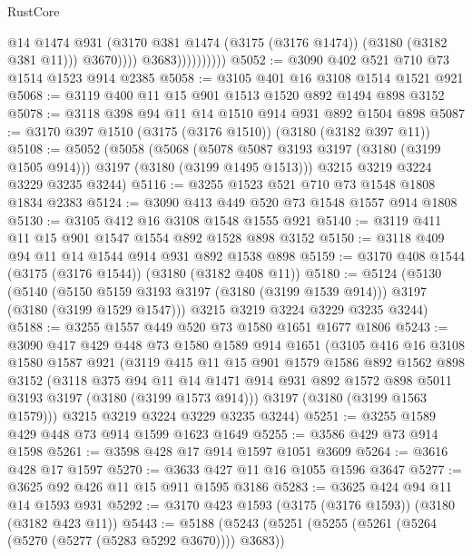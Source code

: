 \begin{lexlean}{RustCore}
\begin{coremodule}
                                @14
                                @1474
                                @931
                                (@3170 @381 @1474 (@3175 (@3176 @1474)) (@3180 (@3182 @381 @11)))
                                @3670))))
                        @3683))))))))))
@5052 := @3090 @402 @521 @710 @73 @1514 @1523 @914 @2385
@5058 := @3105 @401 @16 @3108 @1514 @1521 @921
@5068 := @3119 @400 @11 @15 @901 @1513 @1520 @892 @1494 @898 @3152
@5078 := @3118 @398 @94 @11 @14 @1510 @914 @931 @892 @1504 @898
@5087 := @3170 @397 @1510 (@3175 (@3176 @1510)) (@3180 (@3182 @397 @11))
@5108 := @5052
    (@5058
      (@5068 (@5078 @5087 @3193 @3197 (@3180 (@3199 @1505 @914))) @3197 (@3180 (@3199 @1495 @1513)))
      @3215
      @3219
      @3224
      @3229
      @3235
      @3244)
@5116 := @3255 @1523 @521 @710 @73 @1548 @1808 @1834 @2383
@5124 := @3090 @413 @449 @520 @73 @1548 @1557 @914 @1808
@5130 := @3105 @412 @16 @3108 @1548 @1555 @921
@5140 := @3119 @411 @11 @15 @901 @1547 @1554 @892 @1528 @898 @3152
@5150 := @3118 @409 @94 @11 @14 @1544 @914 @931 @892 @1538 @898
@5159 := @3170 @408 @1544 (@3175 (@3176 @1544)) (@3180 (@3182 @408 @11))
@5180 := @5124
    (@5130
      (@5140 (@5150 @5159 @3193 @3197 (@3180 (@3199 @1539 @914))) @3197 (@3180 (@3199 @1529 @1547)))
      @3215
      @3219
      @3224
      @3229
      @3235
      @3244)
@5188 := @3255 @1557 @449 @520 @73 @1580 @1651 @1677 @1806
@5243 := @3090
    @417
    @429
    @448
    @73
    @1580
    @1589
    @914
    @1651
    (@3105
      @416
      @16
      @3108
      @1580
      @1587
      @921
      (@3119
        @415
        @11
        @15
        @901
        @1579
        @1586
        @892
        @1562
        @898
        @3152
        (@3118
          @375
          @94
          @11
          @14
          @1471
          @914
          @931
          @892
          @1572
          @898
          @5011
          @3193
          @3197
          (@3180 (@3199 @1573 @914)))
        @3197
        (@3180 (@3199 @1563 @1579)))
      @3215
      @3219
      @3224
      @3229
      @3235
      @3244)
@5251 := @3255 @1589 @429 @448 @73 @914 @1599 @1623 @1649
@5255 := @3586 @429 @73 @914 @1598
@5261 := @3598 @428 @17 @914 @1597 @1051 @3609
@5264 := @3616 @428 @17 @1597
@5270 := @3633 @427 @11 @16 @1055 @1596 @3647
@5277 := @3625 @92 @426 @11 @15 @911 @1595 @3186
@5283 := @3625 @424 @94 @11 @14 @1593 @931
@5292 := @3170 @423 @1593 (@3175 (@3176 @1593)) (@3180 (@3182 @423 @11))
@5443 := @5188
    (@5243
      (@5251
        (@5255 (@5261 (@5264 (@5270 (@5277 (@5283 @5292 @3670)))) @3683))

\end{coremodule}
\end{lexlean}
